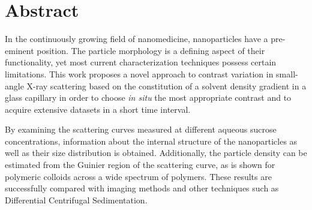 \chapter*{Abstract}

\thispagestyle{empty}



In the continuously growing field of nanomedicine, nanoparticles have a pre-eminent position. The particle morphology is a defining aspect of their functionality, yet most current characterization techniques possess certain limitations. This work proposes a novel approach to contrast variation in small-angle X-ray scattering based on the constitution of a solvent density gradient in a glass capillary in order to choose \emph{in situ} the most appropriate contrast and to acquire extensive datasets in a short time interval.


By examining the scattering curves measured at different aqueous sucrose concentrations, information about the internal structure of the nanoparticles as well as their size distribution is obtained. Additionally, the particle density can be estimated from the Guinier region of the scattering curve, as is shown for polymeric colloids across a wide spectrum of polymers. These results are successfully compared with imaging methods and other techniques such as Differential Centrifugal Sedimentation.

